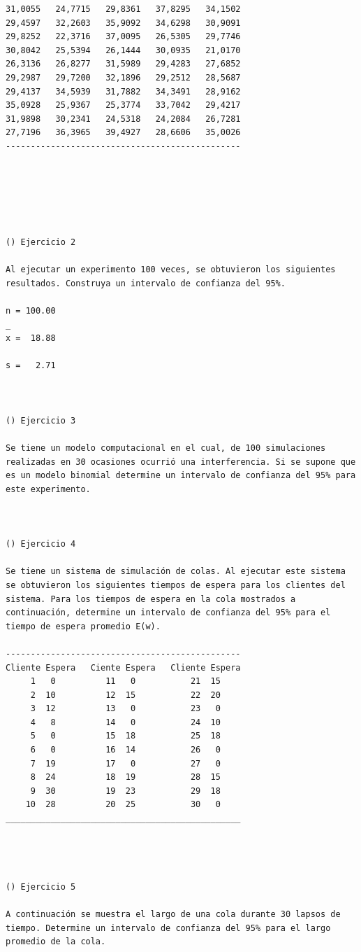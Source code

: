 \begin{verbatim}
31,0055   24,7715   29,8361   37,8295   34,1502
29,4597   32,2603   35,9092   34,6298   30,9091
29,8252   22,3716   37,0095   26,5305   29,7746
30,8042   25,5394   26,1444   30,0935   21,0170
26,3136   26,8277   31,5989   29,4283   27,6852
29,2987   29,7200   32,1896   29,2512   28,5687
29,4137   34,5939   31,7882   34,3491   28,9162
35,0928   25,9367   25,3774   33,7042   29,4217
31,9898   30,2341   24,5318   24,2084   26,7281
27,7196   36,3965   39,4927   28,6606   35,0026
-----------------------------------------------






() Ejercicio 2

Al ejecutar un experimento 100 veces, se obtuvieron los siguientes resultados. Construya un intervalo de confianza del 95%.

n = 100.00
_
x =  18.88

s =   2.71



() Ejercicio 3

Se tiene un modelo computacional en el cual, de 100 simulaciones realizadas en 30 ocasiones ocurrió una interferencia. Si se supone que es un modelo binomial determine un intervalo de confianza del 95% para este experimento.



() Ejercicio 4

Se tiene un sistema de simulación de colas. Al ejecutar este sistema se obtuvieron los siguientes tiempos de espera para los clientes del sistema. Para los tiempos de espera en la cola mostrados a continuación, determine un intervalo de confianza del 95% para el tiempo de espera promedio E(w).

-----------------------------------------------
Cliente Espera   Ciente Espera   Cliente Espera
     1   0          11   0           21  15
     2  10          12  15           22  20
     3  12          13   0           23   0
     4   8          14   0           24  10
     5   0          15  18           25  18
     6   0          16  14           26   0
     7  19          17   0           27   0
     8  24          18  19           28  15
     9  30          19  23           29  18
    10  28          20  25           30   0
_______________________________________________




() Ejercicio 5

A continuación se muestra el largo de una cola durante 30 lapsos de tiempo. Determine un intervalo de confianza del 95% para el largo promedio de la cola.


\end{verbatim}
